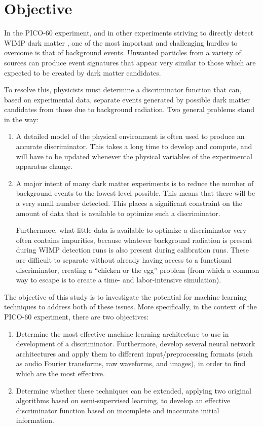 \documentclass[10pt]{article}
\begin{document}
\section{Objective} \label{objective}

In the PICO-60 \cite{pico} experiment, and in other experiments striving to directly detect WIMP dark matter \cite{wimp}, one of the most important and challenging hurdles to overcome is that of background events. Unwanted particles from a variety of sources can produce event signatures that appear very similar to those which are expected to be created by dark matter candidates.

To resolve this, physicists must determine a discriminator function that can, based on experimental data, separate events generated by possible dark matter candidates from those due to background radiation. Two general problems stand in the way:

\begin{enumerate}
    \item A detailed model of the physical environment is often used to produce an accurate discriminator. This takes a long time to develop and compute, and will have to be updated whenever the physical variables of the experimental apparatus change.

    \item A major intent of many dark matter experiments is to reduce the number of background events to the lowest level possible. This means that there will be a very small number detected. This places a significant constraint on the amount of data that is available to optimize such a discriminator.

    Furthermore, what little data is available to optimize a discriminator very often contains impurities, because whatever background radiation is present during WIMP detection runs is also present during calibration runs. These are difficult to separate without already having access to a functional discriminator, creating a ``chicken or the egg'' problem (from which a common way to escape is to create a time- and labor-intensive simulation).
\end{enumerate}

The objective of this study is to investigate the potential for machine learning techniques to address both of these issues. More specifically, in the context of the PICO-60 experiment, there are two objectives:

\begin{enumerate}
    \item Determine the most effective machine learning architecture to use in development of a discriminator. Furthermore, develop several neural network architectures and apply them to different input/preprocessing formats (such as audio Fourier transforms, raw waveforms, and images), in order to find which are the most effective.
    \item Determine whether these techniques can be extended, applying two original algorithms based on semi-supervised learning, to develop an effective discriminator function based on incomplete and inaccurate initial information.
\end{enumerate}
\end{document}
